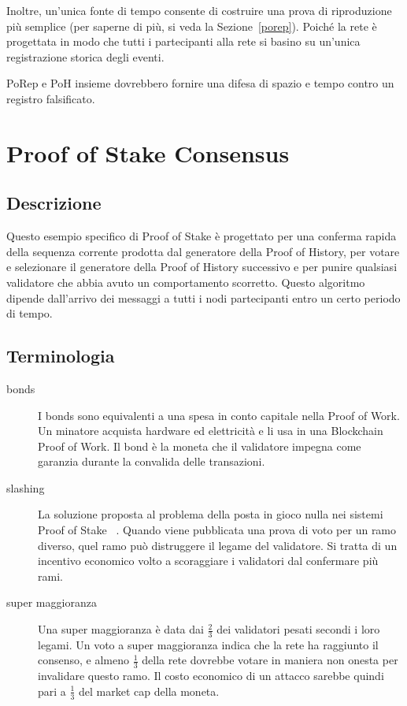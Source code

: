 \documentclass[12pt]{article}
\begin{document}
Inoltre, un'unica fonte di tempo consente di costruire una prova di riproduzione più semplice (per saperne di più, si veda la Sezione~\ref{porep}). Poiché la rete è progettata in modo che tutti i partecipanti alla rete si basino su un'unica registrazione storica degli eventi.

PoRep e PoH insieme dovrebbero fornire una difesa di spazio e tempo contro un registro falsificato.


\section{Proof of Stake Consensus}\label{proof_of_stake}
\subsection{Descrizione}
Questo esempio specifico di Proof of Stake è progettato per una conferma rapida della sequenza corrente prodotta dal generatore della Proof of History, per votare e selezionare il generatore della Proof of History successivo e per punire qualsiasi validatore che abbia avuto un comportamento scorretto. Questo algoritmo dipende dall'arrivo dei messaggi a tutti i nodi partecipanti entro un certo periodo di tempo.

\subsection{Terminologia}
\begin{description}

\item[bonds]
I bonds sono equivalenti a una spesa in conto capitale nella Proof of Work. Un minatore acquista hardware ed elettricità e li usa in una Blockchain Proof of Work. Il bond è la moneta che il validatore impegna come garanzia durante la convalida delle transazioni.

\item[slashing]

La soluzione proposta al problema della posta in gioco nulla nei sistemi Proof of Stake ~\cite{slasher}. Quando viene pubblicata una prova di voto per un ramo diverso, quel ramo può distruggere il legame del validatore. Si tratta di un incentivo economico volto a scoraggiare i validatori dal confermare più rami.
\item[super maggioranza]
Una super maggioranza è data dai \(\frac{2}{3}\) dei validatori pesati secondi i loro legami. Un voto a super maggioranza indica che la rete ha raggiunto il consenso, e almeno \(\frac{1}{3}\) della rete dovrebbe votare in maniera non onesta per invalidare questo ramo. Il costo economico di un attacco sarebbe quindi pari a \(\frac{1}{3}\) del market cap della moneta.

\end{description}
\end{document}
